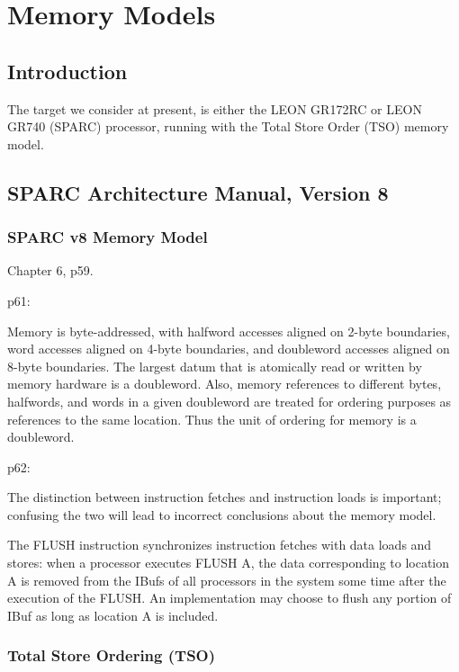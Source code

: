 \section{Memory Models}

\subsection{Introduction}

The target we consider at present,
is either the LEON GR172RC or LEON GR740 (SPARC) processor,
running with the Total Store Order (TSO) memory model.

\subsection{SPARC Architecture Manual, Version 8}

\subsubsection{SPARC v8 Memory Model}

Chapter 6, p59.


p61:

Memory is byte-addressed, with halfword accesses aligned on 2-byte boundaries,
word accesses aligned on 4-byte boundaries,
and doubleword accesses aligned on 8-byte boundaries.
The largest datum that is atomically read or written
by memory hardware is a doubleword.
Also, memory references to different bytes, halfwords,
and words in a given doubleword are treated for ordering purposes as
references to the same location.
Thus the unit of ordering for memory is a doubleword.

p62:

The distinction
between instruction fetches and instruction loads is important;
confusing the two will lead to incorrect conclusions about the memory model.

The FLUSH instruction synchronizes instruction fetches
with data loads and stores:
when a processor executes FLUSH A,
the data corresponding to location A is removed
from the IBufs of all processors in the system
some time after the execution of the FLUSH.
An implementation may choose to flush any portion of IBuf
as long as location A is included.

\subsubsection{Total Store Ordering  (TSO)}


